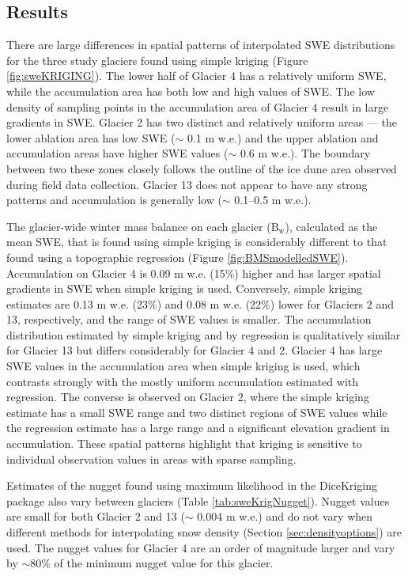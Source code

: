 \documentclass{sfuthesis}
\begin{document}
\subsection{Results}

There are large differences in spatial patterns of interpolated SWE distributions for the three study glaciers found using simple kriging (Figure \ref{fig:sweKRIGING}). The lower half of Glacier 4 has a relatively uniform SWE, while the accumulation area has both low and high values of SWE. The low density of sampling points in the accumulation area of Glacier 4 result in large gradients in SWE. Glacier 2 has two distinct and relatively uniform areas --- the lower ablation area has low SWE ($\sim$ 0.1 m w.e.) and the upper ablation and accumulation areas have higher SWE values ($\sim$ 0.6 m w.e.). The boundary between two these zones closely follows the outline of the ice dune area observed during field data collection. Glacier 13 does not appear to have any strong patterns and accumulation is generally low ($\sim$ 0.1--0.5 m w.e.). 

The glacier-wide winter mass balance on each glacier ($\mathrm{B_w}$), calculated as the mean SWE, that is found using simple kriging is considerably different to that found using a topographic regression (Figure \ref{fig:BMSmodelledSWE}). Accumulation on Glacier 4 is 0.09 m w.e. (15\%) higher and has larger spatial gradients in SWE when simple kriging is used. Conversely, simple kriging estimates are 0.13 m w.e. (23\%) and 0.08 m w.e. (22\%) lower for Glaciers 2 and 13, respectively, and the range of SWE values is smaller. The accumulation distribution estimated by simple kriging and by regression is qualitatively similar for Glacier 13 but differs considerably for Glacier 4 and 2. Glacier 4 has large SWE values in the accumulation area when simple kriging is used, which contrasts strongly with the mostly uniform accumulation estimated with regression. The converse is observed on Glacier 2, where the simple kriging estimate has a small SWE range and two distinct regions of SWE values while the regression estimate has a large range and a significant elevation gradient in accumulation. These spatial patterns highlight that kriging is sensitive to individual observation values in areas with sparse sampling. 

Estimates of the nugget found using maximum likelihood in the DiceKriging package also vary between glaciers (Table \ref{tab:sweKrigNugget}). Nugget values are small for both Glacier 2 and 13 ($\sim$ 0.004 m w.e.) and do not vary when different methods for interpolating snow density (Section \ref{sec:densityoptions}) are used. The nugget values for Glacier 4 are an order of magnitude larger and vary by $\sim$80\% of the minimum nugget value for this glacier. 
\end{document}
